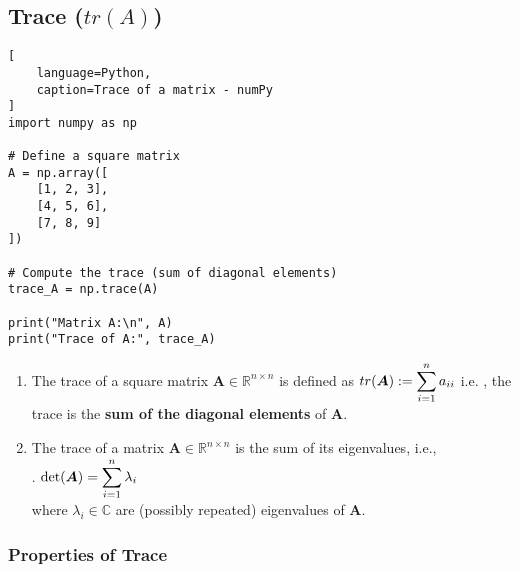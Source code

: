 \subsection{Trace ($tr(A)$)}


\begin{lstlisting}[
    language=Python,
    caption=Trace of a matrix - numPy
]
import numpy as np

# Define a square matrix
A = np.array([
    [1, 2, 3],
    [4, 5, 6],
    [7, 8, 9]
])

# Compute the trace (sum of diagonal elements)
trace_A = np.trace(A)

print("Matrix A:\n", A)
print("Trace of A:", trace_A)
\end{lstlisting}

\begin{enumerate}
    \item 
    \begin{definition}[Trace]
        The trace of a square matrix $\bm{A} \in \mathbb{R}^{n\times n}$ is defined as $tr(\bm{A}) := \displaystyle\sum^n _{i=1} a_{ii}$ i.e. , the trace is the \textbf{sum of the diagonal elements} of $\bm{A}$.
        \hfill \cite{mfml/book/mml/Deisenroth-Faisal-Ong}
    \end{definition}

    \item 
    \begin{theorem}
        The trace of a matrix $\bm{A} \in \mathbb{R}^{n\times n}$ is the sum of its eigenvalues, i.e.,
        \hfill \cite{mfml/book/mml/Deisenroth-Faisal-Ong}
        \\
        .\hfill
        $
            \det(\bm{A}) = \displaystyle\sum_{i=1}^{n} \lambda_i
        $
        \hfill \cite{mfml/book/mml/Deisenroth-Faisal-Ong}
        \\
        where $\lambda_i \in \mathbb{C}$ are (possibly repeated) eigenvalues of $\bm{A}$.
        \hfill \cite{mfml/book/mml/Deisenroth-Faisal-Ong}
    \end{theorem}
\end{enumerate}


\subsubsection{Properties of Trace}

